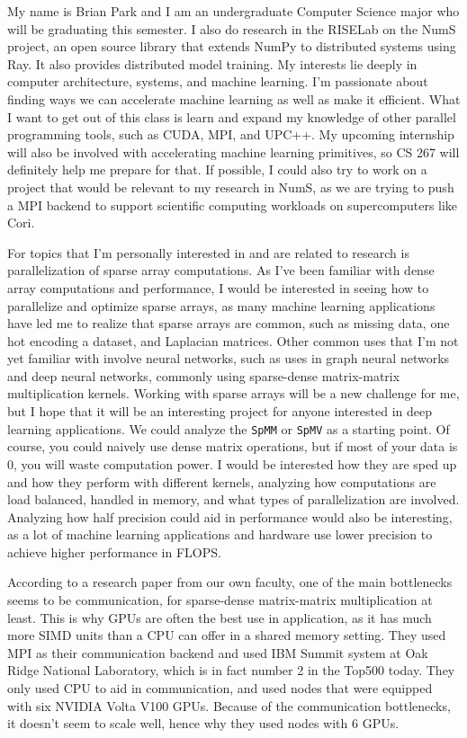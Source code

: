 \documentclass[11pt]{article}
\begin{document}
My name is Brian Park and I am an undergraduate Computer Science major who will be graduating this semester. I also do research in the RISELab on the NumS project, an open source library that extends NumPy to distributed systems using Ray. It also provides distributed model training. My interests lie deeply in computer architecture, systems, and machine learning. I'm passionate about finding ways we can accelerate machine learning as well as make it efficient. What I want to get out of this class is learn and expand my knowledge of other parallel programming tools, such as CUDA, MPI, and UPC++. My upcoming internship will also be involved with accelerating machine learning primitives, so CS 267 will definitely help me prepare for that. If possible, I could also try to work on a project that would be relevant to my research in NumS, as we are trying to push a MPI backend to support scientific computing workloads on supercomputers like Cori.

For topics that I'm personally interested in and are related to research is parallelization of sparse array computations. As I've been familiar with dense array computations and performance, I would be interested in seeing how to parallelize and optimize sparse arrays, as many machine learning applications have led me to realize that sparse arrays are common, such as missing data, one hot encoding a dataset, and Laplacian matrices. Other common uses that I'm not yet familiar with involve neural networks, such as uses in graph neural networks and deep neural networks, commonly using sparse-dense matrix-matrix multiplication kernels. \cite{10.1145/3447818.3461472} Working with sparse arrays will be a new challenge for me, but I hope that it will be an interesting project for anyone interested in deep learning applications. We could analyze the \verb|SpMM| or \verb|SpMV| as a starting point. Of course, you could naively use dense matrix operations, but if most of your data is 0, you will waste computation power. I would be interested how they are sped up and how they perform with different kernels, analyzing how computations are load balanced, handled in memory, and what types of parallelization are involved. Analyzing how half precision could aid in performance would also be interesting, as a lot of machine learning applications and hardware use lower precision to achieve higher performance in FLOPS.

According to a research paper from our own faculty, one of the main bottlenecks seems to be communication, for sparse-dense matrix-matrix multiplication at least. \cite{10.1145/3447818.3461472} This is why GPUs are often the best use in application, as it has much more SIMD units than a CPU can offer in a shared memory setting. They used MPI as their communication backend and used IBM Summit system at Oak Ridge National Laboratory, which is in fact number 2 in the Top500 today. They only used CPU to aid in communication, and used nodes that were equipped with six NVIDIA Volta V100 GPUs. Because of the communication bottlenecks, it doesn't seem to scale well, hence why they used nodes with 6 GPUs.
\end{document}
